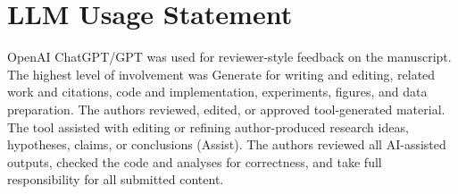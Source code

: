 \cwSaveMainCounters

\section*{LLM Usage Statement}
OpenAI ChatGPT/GPT was used for reviewer-style feedback on the manuscript.
The highest level of involvement was Generate for writing and editing, related
work and citations, code and implementation, experiments, figures, and data
preparation. The authors reviewed, edited, or approved tool-generated material.
The tool assisted with editing or refining author-produced research ideas,
hypotheses, claims, or conclusions (Assist).
The authors reviewed all AI-assisted outputs, checked the code and analyses for
correctness, and take full responsibility for all submitted content.

{\small


}

\ifdefined\ContextWorldFull
  \clearpage
  \appendix
  
\fi

